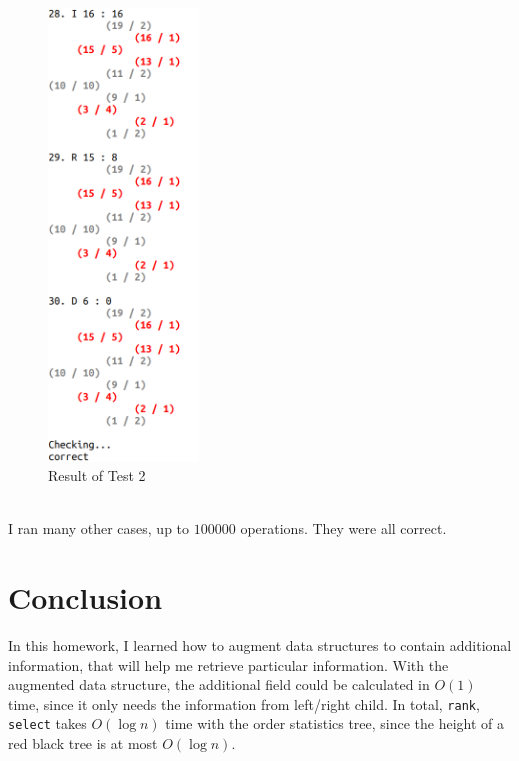 \documentclass[12pt]{article}
\begin{document}
\begin{figure}[h!]
\begin{center}
		\includegraphics[width=4cm, height=12cm]{pic/test2-6.png}
		\caption{Result of Test 2}
	\end{center}
\end{figure}
\pagebreak
\\
I ran many other cases, up to $100000$ operations. They were all correct.
\section{Conclusion}
In this homework, I learned how to augment data structures to contain additional information, that will help me retrieve particular information. With the augmented data structure, the additional field could be calculated in $O(1)$ time, since it only needs the information from left/right child. In total, \texttt{rank}, \texttt{select} takes $O(\log n)$ time with the order statistics tree, since the height of a red black tree is at most $O(\log n)$.
\end{document}
